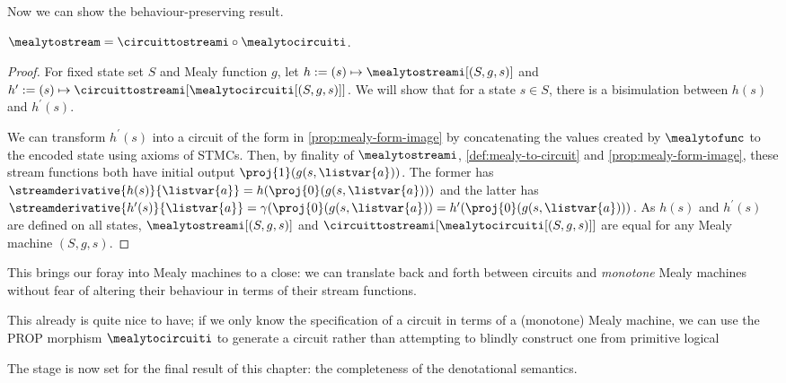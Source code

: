 Now we can show the behaviour-preserving result.

\begin{theorem}\label{thm:mealy-to-circuit}
    \(
        \mealytostream = \circuittostreami \circ \mealytocircuiti
    \).
\end{theorem}
\begin{proof}
    For fixed state set \(S\) and Mealy function \(g\), let
    \(h := (s) \mapsto \mealytostreami[(S, g, s)]\) and \(
        h^\prime := (s) \mapsto \circuittostreami[\mealytocircuiti[(S, g, s)]]
    \).
    We will show that for a state \(s \in S\), there is a bisimulation
    between \(h(s)\) and \(h^\prime(s)\).

    We can transform \(h^\prime(s)\) into a circuit of the form in
    \cref{prop:mealy-form-image} by concatenating the values created by
    \(\mealytofunc\) to the encoded state using axioms of STMCs.
    Then, by finality of \(\mealytostreami\), \cref{def:mealy-to-circuit} and
    \cref{prop:mealy-form-image}, these stream functions both have initial output \(
        \proj{1}(g(s, \listvar{a}))
    \).
    The former has \(
        \streamderivative{h(s)}{\listvar{a}} = h(\proj{0}(g(s, \listvar{a})))
    \) and the latter has \(
        \streamderivative{h^\prime(s)}{\listvar{a}} =
            \gamma(\proj{0}(g(s, \listvar{a})) =
            h^\prime(\proj{0}(g(s, \listvar{a})))
    \).
    As \(h(s)\) and \(h^\prime(s)\) are defined on all states,
    \(\mealytostreami[(S, g, s)]\) and
    \(\circuittostreami[\mealytocircuiti[(S, g, s)]]\) are equal for any Mealy
    machine \((S, g, s)\).
\end{proof}

This brings our foray into Mealy machines to a close: we can translate back and
forth between circuits and \emph{monotone} Mealy machines without fear of
altering their behaviour in terms of their stream functions.

This already is quite nice to have; if we only know the specification of a
circuit in terms of a (monotone) Mealy machine, we can use the PROP morphism
\(\mealytocircuiti\) to generate a circuit rather than attempting to blindly
construct one from primitive logical

The stage is now set for the final result of this chapter: the completeness of
the denotational semantics.